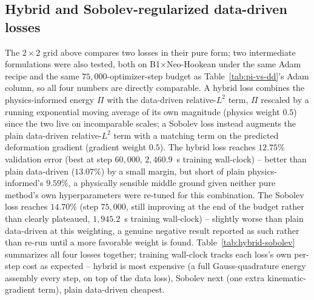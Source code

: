 \documentclass[final,5p,times]{elsarticle}
\begin{document}
\subsection{Hybrid and Sobolev-regularized data-driven losses}
\label{sec:hybrid-sobolev}
The $2\times2$ grid above compares two losses in their pure form; two
intermediate formulations were also tested, both on B1$\times$Neo-Hookean
under the same Adam recipe and the same $75{,}000$-optimizer-step budget
as Table~\ref{tab:pi-vs-dd}'s Adam column, so all four numbers are
directly comparable. A hybrid loss combines the physics-informed energy
$\Pi$ with the data-driven relative-$L^2$ term, $\Pi$ rescaled by a
running exponential moving average of its own magnitude (physics weight
$0.5$) since the two live on incomparable scales; a Sobolev loss instead
augments the plain data-driven relative-$L^2$ term with a matching term
on the predicted deformation gradient (gradient weight $0.5$). The
hybrid loss reaches $12.75\%$ validation error (best at step $60{,}000$,
$2{,}460.9$~s training wall-clock) -- better than plain data-driven
($13.07\%$) by a small margin, but short of plain physics-informed's
$9.59\%$, a physically sensible middle ground given neither pure
method's own hyperparameters were re-tuned for this combination. The
Sobolev loss reaches $14.70\%$ (step $75{,}000$, still improving at the
end of the budget rather than clearly plateaued, $1{,}945.2$~s training
wall-clock) -- slightly worse than plain data-driven at this weighting,
a genuine negative result reported as such rather than re-run until a
more favorable weight is found. Table~\ref{tab:hybrid-sobolev}
summarizes all four losses together; training wall-clock tracks each
loss's own per-step cost as expected -- hybrid is most expensive (a
full Gauss-quadrature energy assembly every step, on top of the data
loss), Sobolev next (one extra kinematic-gradient term), plain
data-driven cheapest.
\end{document}
